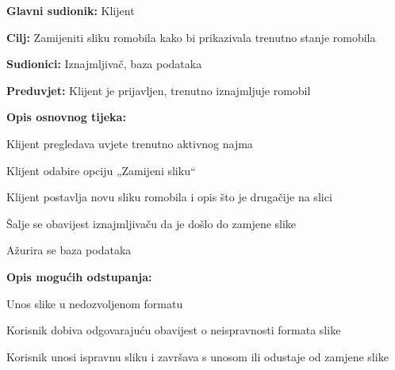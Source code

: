 						\begin{packed_item}
							
							\item \textbf{Glavni sudionik: }Klijent
							\item  \textbf{Cilj: }Zamijeniti sliku romobila kako bi prikazivala trenutno stanje romobila
							\item  \textbf{Sudionici: }Iznajmljivač, baza podataka
							\item  \textbf{Preduvjet: }Klijent je prijavljen, trenutno iznajmljuje romobil
							\item  \textbf{Opis osnovnog tijeka:}
							
							\item[] \begin{packed_enum}
								\item Klijent pregledava uvjete trenutno aktivnog najma
								\item Klijent odabire opciju „Zamijeni sliku“ 
								\item Klijent postavlja novu sliku romobila i opis što je drugačije na slici 
								\item Šalje se obavijest iznajmljivaču da je došlo do zamjene slike   
								\item Ažurira se baza podataka
							\end{packed_enum}
							
							\item  \textbf{Opis mogućih odstupanja:}
							
							\item[] \begin{packed_item}
								
								\item[3.a] Unos slike u nedozvoljenom formatu 
								\item[] \begin{packed_enum}
									
									\item Korisnik dobiva odgovarajuću obavijest o neispravnosti formata slike 
									\item Korisnik unosi ispravnu sliku i završava s unosom ili odustaje od zamjene slike 
									
								\end{packed_enum}		
							\end{packed_item}
						\end{packed_item}
						\noindent {}
